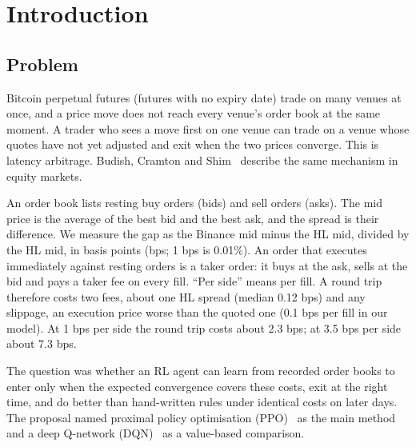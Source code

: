 \documentclass[12pt,a4paper]{article}
\DeclareRobustCommand{\bps}{\ifmmode\,\text{bps}\else\,bps\fi}
\begin{document}
\section{Introduction}\label{sec:intro}

\subsection{Problem}
Bitcoin perpetual futures (futures with no expiry date) trade on many venues at once, and a
price move does not reach every venue's order book at the same moment. A trader who sees a
move first on one venue can trade on a venue whose quotes have not yet adjusted and exit when
the two prices converge. This is latency arbitrage. Budish, Cramton and Shim~\cite{budish}
describe the same mechanism in equity markets.

An order book lists resting buy orders (bids) and sell orders (asks). The mid price is the
average of the best bid and the best ask, and the spread is their difference. We measure the
gap as the Binance mid minus the HL mid, divided by the HL mid, in basis points (bps; 1\bps{}
is 0.01\%). An order that executes immediately against resting orders is a taker order: it
buys at the ask, sells at the bid and pays a taker fee on every fill. ``Per side'' means per
fill. A round trip therefore costs two fees, about one HL spread (median 0.12\bps) and any
slippage, an execution price worse than the quoted one (0.1\bps{} per fill in our model). At
1\bps{} per side the round trip costs about 2.3\bps; at 3.5\bps{} per side about 7.3\bps.

The question was whether an RL agent can learn from recorded order books to enter only when
the expected convergence covers these costs, exit at the right time, and do better than
hand-written rules under identical costs on later days. The proposal named proximal policy
optimisation (PPO)~\cite{ppo} as the main method and a deep Q-network (DQN)~\cite{dqn} as a
value-based comparison.
\end{document}
